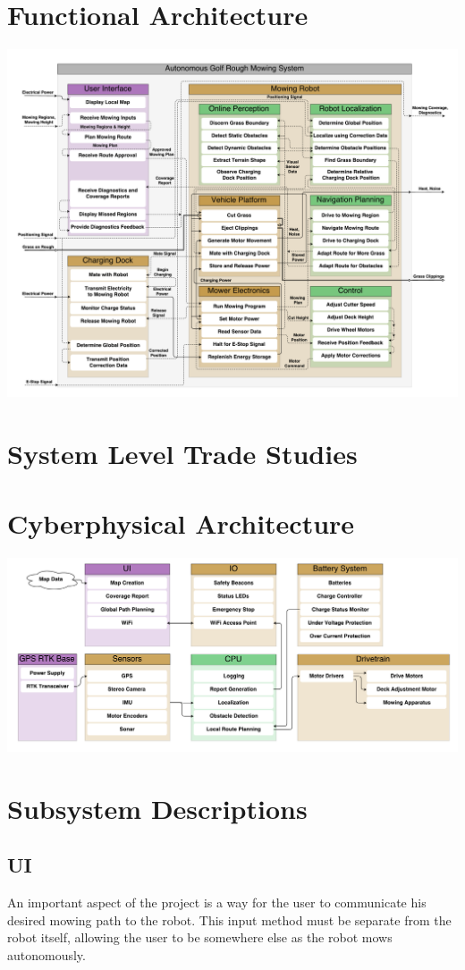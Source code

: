 \documentclass{article}
\begin{document}
\section{Functional Architecture}
\includegraphics[scale=0.3]{functional}

\section{System Level Trade Studies}

\section{Cyberphysical Architecture}
\includegraphics[scale=0.2]{cyberphysical}

\section{Subsystem Descriptions}
	\subsection{UI}
	An important aspect of the project is a way for the user to communicate his desired mowing path to the robot. This input method must be separate from the robot itself, allowing the user to be somewhere else as the robot mows autonomously. 
	
\end{document}
